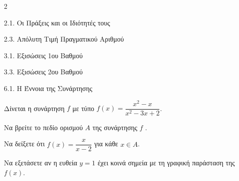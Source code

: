 \begin{ylh}{2}
    \item 2.1. Οι Πράξεις και οι Ιδιότητές τους
    \item 2.3. Απόλυτη Τιμή Πραγματικού Αριθμού
    \item 3.1. Εξισώσεις 1ου Βαθμού
    \item 3.3. Εξισώσεις 2ου Βαθμού
    \item 6.1. Η Έννοια της Συνάρτησης
\end{ylh}
Δίνεται η συνάρτηση $f$ με τύπο $f(x) = \dfrac{x^2-x}{x^2-3x+2}$.
\begin{alist}
\item
   Να βρείτε το πεδίο ορισμού $A$ της συνάρτησης $f$ . 
\item
   Να δείξετε ότι $f(x) = \dfrac{x}{x-2}$ για κάθε $x \in A$. 
\item Να εξετάσετε αν η ευθεία $y = 1$ έχει κοινά σημεία με τη γραφική παράσταση της $f(x)$.

\end{alist}


